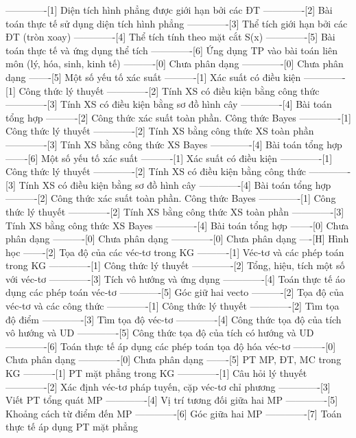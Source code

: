 -------------[1] Diện tích hình phẳng được giới hạn bởi các ĐT
-------------[2] Bài toán thực tế sử dụng diện tích hình phẳng
-------------[3] Thể tích giới hạn bởi các ĐT (tròn xoay)
-------------[4] Thể tích tính theo mặt cắt S(x)
-------------[5] Bài toán thực tế và ứng dụng thể tích
-------------[6] Ứng dụng TP vào bài toán liên môn (lý, hóa, sinh, kinh tế)
----------[0] Chưa phân dạng
-------------[0] Chưa phân dạng
-------[5] Một số yếu tố xác suất
----------[1] Xác suất có điều kiện
-------------[1] Công thức lý thuyết
-------------[2] Tính XS có điều kiện bằng công thức
-------------[3] Tính XS có điều kiện bằng sơ đồ hình cây
-------------[4] Bài toán tổng hợp
----------[2] Công thức xác suất toàn phần. Công thức Bayes
-------------[1] Công thức lý thuyết
-------------[2] Tính XS bằng công thức XS toàn phần
-------------[3] Tính XS bằng công thức XS Bayes
-------------[4] Bài toán tổng hợp
-------[6] Một số yếu tố xác suất
----------[1] Xác suất có điều kiện
-------------[1] Công thức lý thuyết
-------------[2] Tính XS có điều kiện bằng công thức
-------------[3] Tính XS có điều kiện bằng sơ đồ hình cây
-------------[4] Bài toán tổng hợp
----------[2] Công thức xác suất toàn phần. Công thức Bayes
-------------[1] Công thức lý thuyết
-------------[2] Tính XS bằng công thức XS toàn phần
-------------[3] Tính XS bằng công thức XS Bayes
-------------[4] Bài toán tổng hợp
-------[0] Chưa phân dạng
----------[0] Chưa phân dạng
-------------[0] Chưa phân dạng
----[H] Hình học
-------[2] Tọa độ của các véc-tơ trong KG
----------[1] Véc-tơ và các phép toán trong KG
-------------[1] Công thức lý thuyết
-------------[2] Tổng, hiệu, tích một số với véc-tơ
-------------[3] Tích vô hướng và ứng dụng
-------------[4] Toán thực tế áo dụng các phép toán véc-tơ
-------------[5] Góc giữ hai vecto
----------[2] Tọa độ của véc-tơ và các công thức
-------------[1] Công thức lý thuyết
-------------[2] Tìm tọa độ điểm
-------------[3] Tìm tọa độ véc-tơ
-------------[4] Công thức tọa độ của tích vô hướng và UD
-------------[5] Công thức tọa độ của tích có hướng và UD
-------------[6] Toán thực tế áp dụng các phép toán tọa độ hóa véc-tơ
----------[0] Chưa phân dạng
-------------[0] Chưa phân dạng
-------[5] PT MP, ĐT, MC trong KG 
----------[1] PT mặt phẳng trong KG
-------------[1] Câu hỏi lý thuyết
-------------[2] Xác định véc-tơ pháp tuyến, cặp véc-tơ chỉ phương
-------------[3] Viết PT tổng quát MP
-------------[4] Vị trí tương đối giữa hai MP
-------------[5] Khoảng cách từ điểm đến MP
-------------[6] Góc giữa hai MP
-------------[7] Toán thực tế áp dụng PT mặt phẳng
